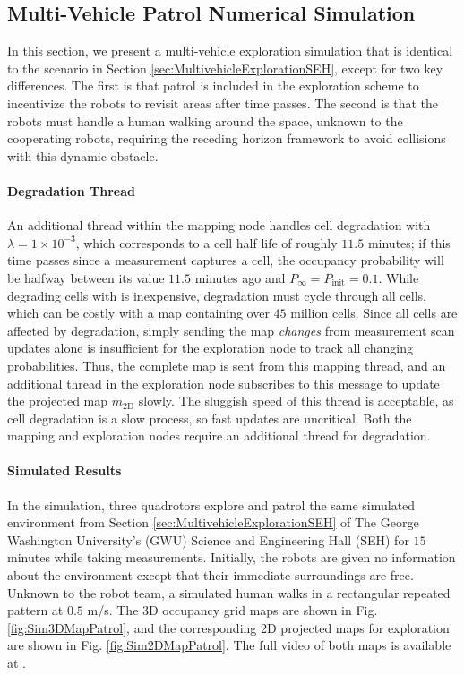 \subsection{Multi-Vehicle Patrol Numerical Simulation}
\label{sec:MultivehiclePatrolSEH}



In this section, we present a multi-vehicle exploration simulation that is identical to the scenario in Section \ref{sec:MultivehicleExplorationSEH}, except for two key differences. The first is that patrol is included in the exploration scheme to incentivize the robots to revisit areas after time passes. The second is that the robots must handle a human walking around the space, unknown to the cooperating robots, requiring the receding horizon framework to avoid collisions with this dynamic obstacle.

\paragraph{Degradation Thread}
An additional thread within the mapping node handles cell degradation with $\lambda=1\times10^{-3}$, which corresponds to a cell half life of roughly $11.5$ minutes; if this time passes since a measurement captures a cell, the occupancy probability will be halfway between its value $11.5$ minutes ago and $P_\infty=P_\text{init}=0.1$. While degrading cells with  is inexpensive, degradation must cycle through all cells, which can be costly with a map containing over $45$ million cells. Since all cells are affected by degradation, simply sending the map \emph{changes} from measurement scan updates alone is insufficient for the exploration node to track all changing probabilities. Thus, the complete map is sent from this mapping thread, and an additional thread in the exploration node subscribes to this message to update the projected map $m_\text{2D}$ slowly. The sluggish speed of this thread is acceptable, as cell degradation is a slow process, so fast updates are uncritical. Both the mapping and exploration nodes require an additional thread for degradation.


\paragraph{Simulated Results}

In the simulation, three quadrotors explore and patrol the same simulated environment from Section \ref{sec:MultivehicleExplorationSEH} of The George Washington University's (GWU) Science and Engineering Hall (SEH) for $15$ minutes while taking measurements. Initially, the robots are given no information about the environment except that their immediate surroundings are free. Unknown to the robot team, a simulated human walks in a rectangular repeated pattern at $0.5$ m/s. The 3D occupancy grid maps are shown in Fig. \ref{fig:Sim3DMapPatrol}, and the corresponding 2D projected maps for exploration are shown in Fig. \ref{fig:Sim2DMapPatrol}. The full video of both maps is available at \href{https://youtu.be/bsLG2romP_8}{}.




